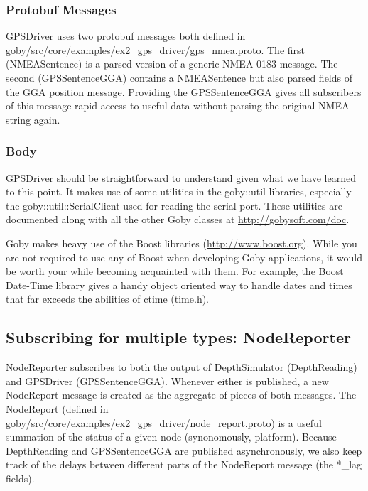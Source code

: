\documentclass[11pt, letterpaper]{article}
\begin{document}
\subsubsection{Protobuf Messages}
GPSDriver uses two protobuf messages both defined in \\ \href{http://bazaar.launchpad.net/~goby-dev/goby/trunk/annotate/head:/src/core/examples/ex2_gps_driver/gps_nmea.proto}{goby/src/core/examples/ex2\_gps\_driver/gps\_nmea.proto}. The first (NMEASentence) is a parsed version of a generic NMEA-0183 message. The second (GPSSentenceGGA) contains a NMEASentence but also parsed fields of the GGA position message. Providing the GPSSentenceGGA gives all subscribers of this message rapid access to useful data without parsing the original NMEA string again.

\subsubsection{Body}
GPSDriver should be straightforward to understand given what we have learned to this point. It makes use of some utilities in the goby::util libraries, especially the goby::util::SerialClient used for reading the serial port. These utilities are documented along with all the other Goby classes at \url{http://gobysoft.com/doc}.

Goby makes heavy use of the Boost libraries (\url{http://www.boost.org}). While you are not required to use any of Boost when developing Goby applications, it would be worth your while becoming acquainted with them. For example, the Boost Date-Time library gives a handy object oriented way to handle dates and times that far exceeds the abilities of ctime (time.h).

\subsection{Subscribing for multiple types: NodeReporter}

NodeReporter subscribes to both the output of DepthSimulator (DepthReading) and GPSDriver (GPSSentenceGGA). Whenever either is published, a new NodeReport message is created as the aggregate of pieces of both messages. The NodeReport (defined in \\ \href{http://bazaar.launchpad.net/~goby-dev/goby/trunk/annotate/head:/src/core/xamples/ex2_gps_driver/node_report.proto}{goby/src/core/examples/ex2\_gps\_driver/node\_report.proto}) is a useful summation of the status of a given node (synonomously, platform). Because DepthReading and GPSSentenceGGA are published asynchronously, we also keep track of the delays between different parts of the NodeReport message (the *\_lag fields). 
\end{document}
